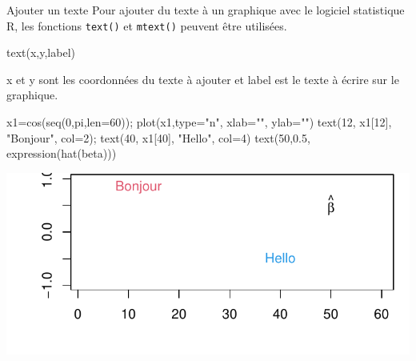 \documentclass[
  8pt,
  ignorenonframetext,
]{beamer}
\newenvironment{Shaded}{\begin{snugshade}}{\end{snugshade}}
\newcommand{\AttributeTok}[1]{\textcolor[rgb]{0.77,0.63,0.00}{#1}}
\newcommand{\DecValTok}[1]{\textcolor[rgb]{0.00,0.00,0.81}{#1}}
\newcommand{\FloatTok}[1]{\textcolor[rgb]{0.00,0.00,0.81}{#1}}
\newcommand{\FunctionTok}[1]{\textcolor[rgb]{0.00,0.00,0.00}{#1}}
\newcommand{\NormalTok}[1]{#1}
\newcommand{\OtherTok}[1]{\textcolor[rgb]{0.56,0.35,0.01}{#1}}
\newcommand{\StringTok}[1]{\textcolor[rgb]{0.31,0.60,0.02}{#1}}
\begin{document}
\begin{frame}[fragile]{Ajouter un texte}
\protect\hypertarget{ajouter-un-texte}{}
Pour ajouter du texte à un graphique avec le logiciel statistique R, les
fonctions \texttt{text()} et \texttt{mtext()} peuvent être utilisées.

\begin{Shaded}
\begin{Highlighting}[]
\FunctionTok{text}\NormalTok{(x,y,label)}
\end{Highlighting}
\end{Shaded}

x et y sont les coordonnées du texte à ajouter et label est le texte à
écrire sur le graphique.

\begin{Shaded}
\begin{Highlighting}[]
\NormalTok{x1}\OtherTok{=}\FunctionTok{cos}\NormalTok{(}\FunctionTok{seq}\NormalTok{(}\DecValTok{0}\NormalTok{,pi,}\AttributeTok{len=}\DecValTok{60}\NormalTok{)); }\FunctionTok{plot}\NormalTok{(x1,}\AttributeTok{type=}\StringTok{"n"}\NormalTok{, }\AttributeTok{xlab=}\StringTok{""}\NormalTok{, }\AttributeTok{ylab=}\StringTok{""}\NormalTok{)}
\FunctionTok{text}\NormalTok{(}\DecValTok{12}\NormalTok{, x1[}\DecValTok{12}\NormalTok{], }\StringTok{"Bonjour"}\NormalTok{, }\AttributeTok{col=}\DecValTok{2}\NormalTok{); }\FunctionTok{text}\NormalTok{(}\DecValTok{40}\NormalTok{, x1[}\DecValTok{40}\NormalTok{], }\StringTok{"Hello"}\NormalTok{, }\AttributeTok{col=}\DecValTok{4}\NormalTok{)}
\FunctionTok{text}\NormalTok{(}\DecValTok{50}\NormalTok{,}\FloatTok{0.5}\NormalTok{, }\FunctionTok{expression}\NormalTok{(}\FunctionTok{hat}\NormalTok{(beta)))}
\end{Highlighting}
\end{Shaded}

\begin{center}\includegraphics{Chap2_R_files/figure-beamer/unnamed-chunk-8-1} \end{center}
\end{frame}
\end{document}
